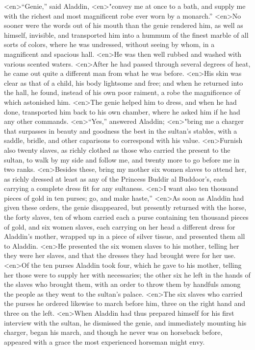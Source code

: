 <en>“Genie,” said Aladdin,
<en>"convey me at once to a bath, and supply me with the richest and most magnificent robe ever worn by a monarch.”
<en>No sooner were the words out of his mouth than the genie rendered him, as well as himself, invisible, and transported him into a hummum of the finest marble of all sorts of colors, where he was undressed, without seeing by whom, in a magnificent and spacious hall.
<en>He was then well rubbed and washed with various scented waters.
<en>After he had passed through several degrees of heat, he came out quite a different man from what he was before.
<en>His skin was clear as that of a child, his body lightsome and free; and when he returned into the hall, he found, instead of his own poor raiment, a robe the magnificence of which astonished him.
<en>The genie helped him to dress, and when he had done, transported him back to his own chamber, where he asked him if he had any other commands.
<en>“Yes,” answered Aladdin;
<en>"bring me a charger that surpasses in beauty and goodness the best in the sultan’s stables, with a saddle, bridle, and other caparisons to correspond with his value.
<en>Furnish also twenty slaves, as richly clothed as those who carried the present to the sultan, to walk by my side and follow me, and twenty more to go before me in two ranks.
<en>Besides these, bring my mother six women slaves to attend her, as richly dressed at least as any of the Princess Buddir al Buddoor’s, each carrying a complete dress fit for any sultaness.
<en>I want also ten thousand pieces of gold in ten purses; go, and make haste,”
<en>As soon as Aladdin had given these orders, the genie disappeared, but presently returned with the horse, the forty slaves, ten of whom carried each a purse containing ten thousand pieces of gold, and six women slaves, each carrying on her head a different dress for Aladdin’s mother, wrapped up in a piece of silver tissue, and presented them all to Aladdin.
<en>He presented the six women slaves to his mother, telling her they were her slaves, and that the dresses they had brought were for her use.
<en>Of the ten purses Aladdin took four, which he gave to his mother, telling her those were to supply her with necessaries; the other six he left in the hands of the slaves who brought them, with an order to throw them by handfuls among the people as they went to the sultan’s palace.
<en>The six slaves who carried the purses he ordered likewise to march before him, three on the right hand and three on the left.
<en>When Aladdin had thus prepared himself for his first interview with the sultan, he dismissed the genie, and immediately mounting his charger, began his march, and though he never was on horseback before, appeared with a grace the most experienced horseman might envy.
